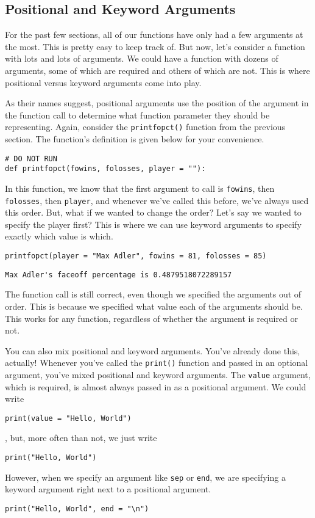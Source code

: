 \subsection{Positional and Keyword Arguments}
For the past few sections, all of our functions have only had a few arguments at the most. This is pretty easy to keep track of. But now, let's consider a function with lots and lots of arguments. We could have a function with dozens of arguments, some of which are required and others of which are not. This is where positional versus keyword arguments come into play.\par
As their names suggest, positional arguments use the position of the argument in the function call to determine what function parameter they should be representing. Again, consider the \verb|printfopct()| function from the previous section. The function's definition is given below for your convenience.\par
\begin{lstlisting}[style=pippython]
# DO NOT RUN
def printfopct(fowins, folosses, player = ""):
\end{lstlisting}
In this function, we know that the first argument to call is \verb|fowins|, then \verb|folosses|, then \verb|player|, and whenever we've called this before, we've always used this order. But, what if we wanted to change the order? Let's say we wanted to specify the player first? This is where we can use keyword arguments to specify exactly which value is which.\par
\begin{lstlisting}[style=pippython]
printfopct(player = "Max Adler", fowins = 81, folosses = 85)
\end{lstlisting}
\begin{lstlisting}[style=none]
Max Adler's faceoff percentage is 0.4879518072289157
\end{lstlisting}
The function call is still correct, even though we specified the arguments out of order. This is because we specified what value each of the arguments should be. This works for any function, regardless of whether the argument is required or not.\par
You can also mix positional and keyword arguments. You've already done this, actually! Whenever you've called the \verb|print()| function and passed in an optional argument, you've mixed positional and keyword arguments. The \verb|value| argument, which is required, is almost always passed in as a positional argument. We could write
\begin{lstlisting}[style=pippython]
print(value = "Hello, World")
\end{lstlisting}
, but, more often than not, we just write
\begin{lstlisting}[style=pippython]
print("Hello, World")
\end{lstlisting}
However, when we specify an argument like \verb|sep| or \verb|end|, we are specifying a keyword argument right next to a positional argument.\par
\begin{lstlisting}[style=pippython]
print("Hello, World", end = "\n")
\end{lstlisting}
